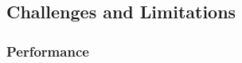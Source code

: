 \documentclass{article}
\newcommand{\indentsize}{1.25em}
\newcommand{\pbodyitem}[2]{
    \item \textbf{{#1}} {
    \parindent \indentsize \newline {#2}
}
}
\begin{document}
{\begin{itemize}
{    %


  }
\end{itemize}


\subsection{Challenges and Limitations}
\subsubsection{Performance}



\newpage



}
\end{document}
